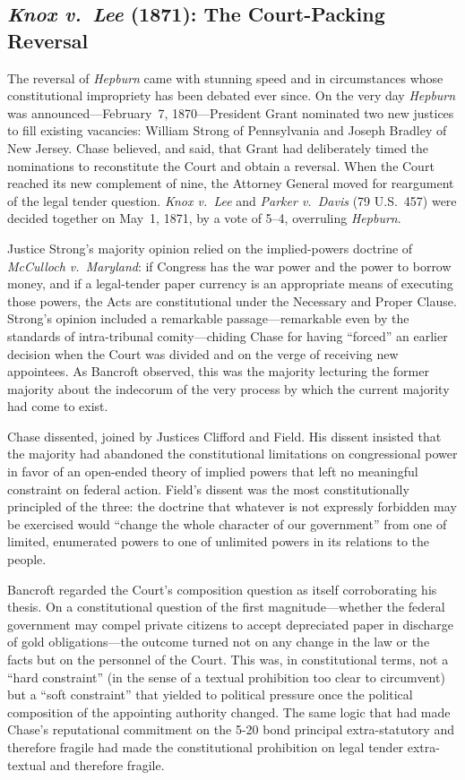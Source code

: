 \documentclass[12pt]{article}
\begin{document}
\subsection{\textit{Knox v.\ Lee} (1871): The Court-Packing Reversal}

The reversal of \textit{Hepburn} came with stunning speed and in
circumstances whose constitutional impropriety has been debated ever
since.  On the very day \textit{Hepburn} was announced---February~7,
1870---President Grant nominated two new justices to fill existing
vacancies: William Strong of Pennsylvania and Joseph Bradley of New
Jersey.  Chase believed, and said, that Grant had deliberately timed
the nominations to reconstitute the Court and obtain a reversal.  When
the Court reached its new complement of nine, the Attorney General moved
for reargument of the legal tender question.  \textit{Knox v.\ Lee} and
\textit{Parker v.\ Davis} (79 U.S.\ 457) were decided together on
May~1, 1871, by a vote of 5--4, overruling \textit{Hepburn}.

Justice Strong's majority opinion relied on the implied-powers doctrine
of \textit{McCulloch v.\ Maryland}: if Congress has the war power and
the power to borrow money, and if a legal-tender paper currency is an
appropriate means of executing those powers, the Acts are constitutional
under the Necessary and Proper Clause.  Strong's opinion included a
remarkable passage---remarkable even by the standards of intra-tribunal
comity---chiding Chase for having ``forced'' an earlier decision when
the Court was divided and on the verge of receiving new appointees.
As Bancroft observed, this was the majority lecturing the former
majority about the indecorum of the very process by which the current
majority had come to exist.

Chase dissented, joined by Justices Clifford and Field.  His dissent
insisted that the majority had abandoned the constitutional limitations
on congressional power in favor of an open-ended theory of implied
powers that left no meaningful constraint on federal action.  Field's
dissent was the most constitutionally principled of the three:
the doctrine that whatever is not expressly forbidden may be exercised
would ``change the whole character of our government'' from one of
limited, enumerated powers to one of unlimited powers in its relations
to the people.

Bancroft regarded the Court's composition question as itself
corroborating his thesis.  On a constitutional question of the first
magnitude---whether the federal government may compel private citizens
to accept depreciated paper in discharge of gold obligations---the
outcome turned not on any change in the law or the facts but on the
personnel of the Court.  This was, in constitutional terms, not a
``hard constraint'' (in the sense of a textual prohibition too clear
to circumvent) but a ``soft constraint'' that yielded to political
pressure once the political composition of the appointing authority
changed.  The same logic that had made Chase's reputational commitment
on the 5-20 bond principal extra-statutory and therefore fragile had
made the constitutional prohibition on legal tender extra-textual and
therefore fragile.
\end{document}
